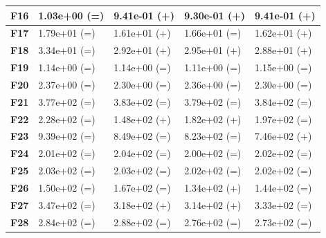 \documentclass[12pt,a4paper]{report}
\begin{document}
{{{{{{{\begin{table}[h]
\begin{tabular}{|l|l|l|l|l|}
{\bf F16} & 1.03e+00 (=)        & 9.41e-01 (+)     & 9.30e-01 (+)      & 9.41e-01 (+)      \\ \hline
{\bf F17} & 1.79e+01 (=)        & 1.61e+01 (+)     & 1.66e+01 (=)      & 1.62e+01 (+)      \\ \hline
{\bf F18} & 3.34e+01 (=)        & 2.92e+01 (+)     & 2.95e+01 (+)      & 2.88e+01 (+)      \\ \hline
{\bf F19} & 1.14e+00 (=)        & 1.14e+00 (=)     & 1.11e+00 (=)      & 1.15e+00 (=)      \\ \hline
{\bf F20} & 2.37e+00 (=)        & 2.30e+00 (=)     & 2.36e+00 (=)      & 2.30e+00 (=)      \\ \hline
{\bf F21} & 3.77e+02 (=)        & 3.83e+02 (=)     & 3.79e+02 (=)      & 3.84e+02 (=)      \\ \hline
{\bf F22} & 2.28e+02 (=)        & 1.48e+02 (+)     & 1.82e+02 (+)      & 1.97e+02 (=)      \\ \hline
{\bf F23} & 9.39e+02 (=)        & 8.49e+02 (=)     & 8.23e+02 (=)      & 7.46e+02 (+)      \\ \hline
{\bf F24} & 2.01e+02 (=)        & 2.04e+02 (=)     & 2.00e+02 (=)      & 2.02e+02 (=)      \\ \hline
{\bf F25} & 2.03e+02 (=)        & 2.03e+02 (=)     & 2.02e+02 (=)      & 2.02e+02 (=)      \\ \hline
{\bf F26} & 1.50e+02 (=)        & 1.67e+02 (=)     & 1.34e+02 (+)      & 1.44e+02 (=)      \\ \hline
{\bf F27} & 3.47e+02 (=)        & 3.18e+02 (+)     & 3.14e+02 (+)      & 3.33e+02 (=)      \\ \hline
{\bf F28} & 2.84e+02 (=)        & 2.88e+02 (=)     & 2.76e+02 (=)      & 2.73e+02 (=)      \\ \hline
\end{tabular}
\end{table}

}}}}}}}
\end{document}
